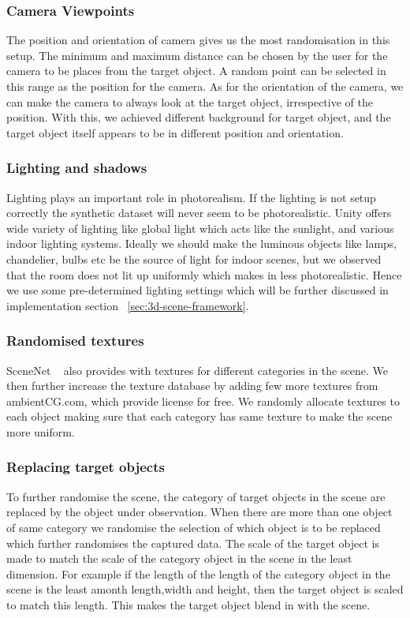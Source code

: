 \subsubsection{Camera Viewpoints}
The position and orientation of camera gives us the most randomisation in this setup.
The minimum and maximum distance can be chosen by the user for the camera to be places from the target object.
A random point can be selected in this range as the position for the camera.
As for the orientation of the camera, we can make the camera to always look at the target object, irrespective of the position.
With this, we achieved different background for target object, and the target object itself appears to be in different position and orientation.

\subsubsection{Lighting and shadows}
Lighting plays an important role in photorealism.
If the lighting is not setup correctly the synthetic dataset will never seem to be photorealistic.
Unity offers wide variety of lighting like global light which acts like the sunlight, and various indoor lighting systems.
Ideally we should make the luminous objects like lamps, chandelier, bulbs etc be the source of light for indoor scenes, but we observed that the room does not lit up uniformly which makes in less photorealistic.
Hence we use some pre-determined lighting settings which will be further discussed in implementation section ~\ref{sec:3d-scene-framework}.

\subsubsection{Randomised textures}
SceneNet ~\cite{McCormac:etal:ICCV2017} also provides with textures for different categories in the scene.
We then further increase the texture database by adding few more textures from ambientCG.com, which provide license for free.
We randomly allocate textures to each object making sure that each category has same texture to make the scene more uniform.

\subsubsection{Replacing target objects}
To further randomise the scene, the category of target objects in the scene are replaced by the object under observation.
When there are more than one object of same category we randomise the selection of which object is to be replaced which further randomises the captured data.
The scale of the target object is made to match the scale of the category object in the scene in the least dimension.
For example if the length of the length of the category object in the scene is the least amonth length,width and height, then the target object is scaled to match this length.
This makes the target object blend in with the scene.

